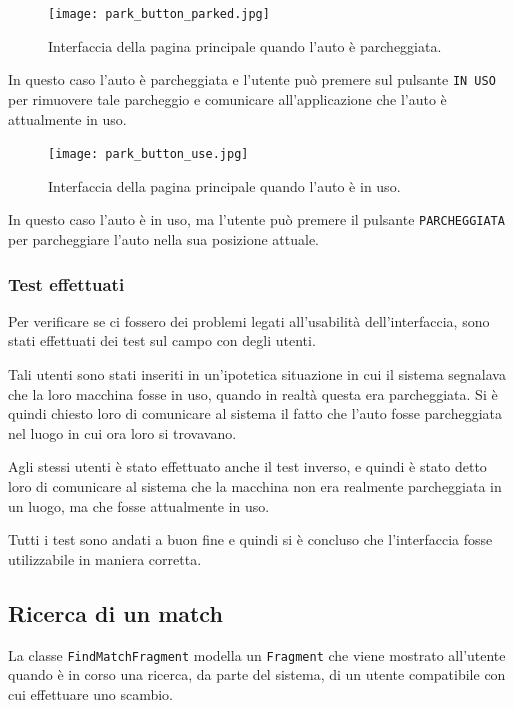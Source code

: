 \begin{figure}[H]
\centering
\texttt{[image: park\_button\_parked.jpg]}
\caption{Interfaccia della pagina principale quando l'auto è parcheggiata.}
\end{figure}

In questo caso l'auto è parcheggiata e l'utente può premere sul pulsante \texttt{IN USO} per rimuovere tale parcheggio e comunicare all'applicazione che l'auto è attualmente in uso.

\begin{figure}[H]
\centering
\texttt{[image: park\_button\_use.jpg]}
\caption{Interfaccia della pagina principale quando l'auto è in uso.}
\end{figure}

In questo caso l'auto è in uso, ma l'utente può premere il pulsante \texttt{PARCHEGGIATA} per parcheggiare l'auto nella sua posizione attuale.

\hypertarget{test-effettuati}{%
\subsubsection{Test effettuati}\label{test-effettuati}}

Per verificare se ci fossero dei problemi legati all'usabilità dell'interfaccia, sono stati effettuati dei test sul campo con degli utenti.

Tali utenti sono stati inseriti in un'ipotetica situazione in cui il sistema segnalava che la loro macchina fosse in uso, quando in realtà questa era parcheggiata. Si è quindi chiesto loro di comunicare al sistema il fatto che l'auto fosse parcheggiata nel luogo in cui ora loro si trovavano.

Agli stessi utenti è stato effettuato anche il test inverso, e quindi è stato detto loro di comunicare al sistema che la macchina non era realmente parcheggiata in un luogo, ma che fosse attualmente in uso.

Tutti i test sono andati a buon fine e quindi si è concluso che l'interfaccia fosse utilizzabile in maniera corretta.

\hypertarget{interfaccia-per-ricerca-di-un-match}{%
\subsection{Ricerca di un match}\label{interfaccia-per-ricerca-di-un-match}}

La classe \texttt{FindMatchFragment} modella un \texttt{Fragment} che viene mostrato all'utente quando è in corso una ricerca, da parte del sistema, di un utente compatibile con cui effettuare uno scambio.

